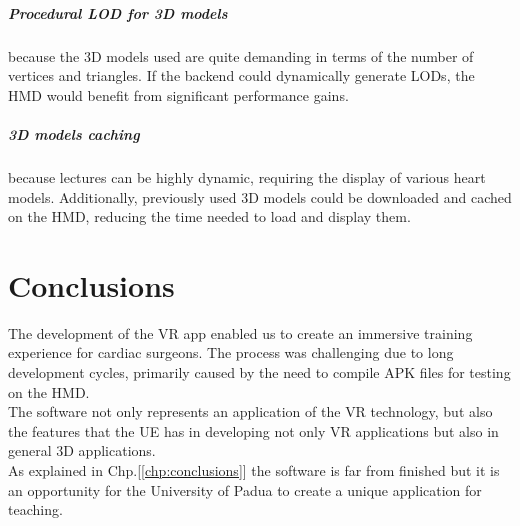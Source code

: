 \paragraph{Procedural \ac{LOD} for 3D models}
because the 3D models used are quite demanding in terms of the number of vertices and triangles. If the backend could dynamically generate \ac{LOD}s, the \ac{HMD} would benefit from significant performance gains.

\paragraph{3D models caching}
because lectures can be highly dynamic, requiring the display of various heart models. Additionally, previously used 3D models could be downloaded and cached on the \ac{HMD}, reducing the time needed to load and display them.


\chapter{Conclusions}
\noindent
The development of the \ac{VR} app enabled us to create an immersive training experience for cardiac surgeons.
The process was challenging due to long development cycles, primarily caused by the need to compile \ac{APK} files for testing on the \ac{HMD}.\\
The software not only represents an application of the \ac{VR} technology, but also the features  that the \ac{UE} has in developing not only \ac{VR} applications but also in general 3D applications.\\
As explained in Chp.[\ref{chp:conclusions}] the software is far from finished but it is an opportunity for the University of Padua to create a unique application for teaching.\\